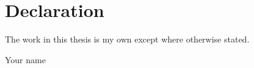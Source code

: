 
\chapter*{Declaration}\label{declaration}
\thispagestyle{empty}
The work in this thesis is my own except where otherwise stated.

\vspace{1in}


\hfill\hfill\hfill
%
Your name
%
\hspace*{\fill}
